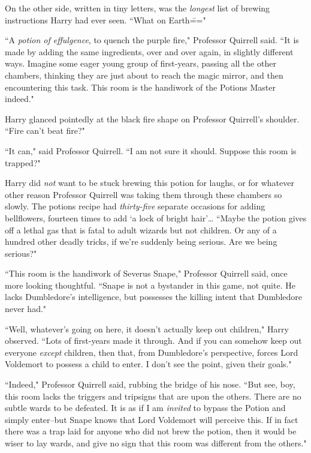 On the other side, written in tiny letters, was the \emph{longest} list of brewing instructions Harry had ever seen. ``What on Earth\==="

``A \emph{potion of effulgence}, to quench the purple fire," Professor Quirrell said. ``It is made by adding the same ingredients, over and over again, in slightly different ways. Imagine some eager young group of first-years, passing all the other chambers, thinking they are just about to reach the magic mirror, and then encountering this task. This room is the handiwork of the Potions Master indeed."

Harry glanced pointedly at the black fire shape on Professor Quirrell's shoulder. ``Fire can't beat fire?"

``It can," said Professor Quirrell. ``I am not sure it should. Suppose this room is trapped?"

Harry did \emph{not} want to be stuck brewing this potion for laughs, or for whatever other reason Professor Quirrell was taking them through these chambers so slowly. The potions recipe had \emph{thirty-five} separate occasions for adding bellflowers, fourteen times to add `a lock of bright hair'{\ldots} ``Maybe the potion gives off a lethal gas that is fatal to adult wizards but not children. Or any of a hundred other deadly tricks, if we're suddenly being serious. Are we being serious?"

``This room is the handiwork of Severus Snape," Professor Quirrell said, once more looking thoughtful. ``Snape is not a bystander in this game, not quite. He lacks Dumbledore's intelligence, but possesses the killing intent that Dumbledore never had."

``Well, whatever's going on here, it doesn't actually keep out children," Harry observed. ``Lots of first-years made it through. And if you can somehow keep out everyone \emph{except} children, then that, from Dumbledore's perspective, forces Lord Voldemort to possess a child to enter. I don't see the point, given their goals."

``Indeed," Professor Quirrell said, rubbing the bridge of his nose. ``But see, boy, this room lacks the triggers and tripsigns that are upon the others. There are no subtle wards to be defeated. It is as if I am \emph{invited} to bypass the Potion and simply enter\---but Snape knows that Lord Voldemort will perceive this. If in fact there was a trap laid for anyone who did not brew the potion, then it would be wiser to lay wards, and give no sign that this room was different from the others."

